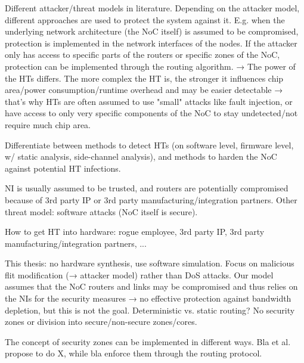 Different attacker/threat models in literature. Depending on the attacker model, different approaches are used to protect the system against it.
E.g. when the underlying network architecture (the NoC itself) is assumed to be compromised, protection is implemented in the network interfaces
of the nodes. If the attacker only has access to specific parts of the routers or specific zones of the NoC, protection can be implemented through
the routing algorithm. → The power of the HTs differs. The more complex the HT is, the stronger it influences chip area/power consumption/runtime
overhead and may be easier detectable → that's why HTs are often assumed to use "small" attacks like fault injection, or have access to only very
specific components of the NoC to stay undetected/not require much chip area.

Differentiate between methods to detect HTs (on software level, firmware level, w/ static analysis, side-channel analysis), and methods to harden
the NoC against potential HT infections.

NI is usually assumed to be trusted, and routers are potentially compromised because of 3rd party IP or 3rd party manufacturing/integration
partners. Other threat model: software attacks (NoC itself is secure).

How to get HT into hardware: rogue employee, 3rd party IP, 3rd party manufacturing/integration partners, ...

This thesis: no hardware synthesis, use software simulation. Focus on malicious flit modification (→ attacker model) rather than DoS attacks. Our
model assumes that the NoC routers and links may be compromised and thus relies on the NIs for the security measures → no effective protection
against bandwidth depletion, but this is not the goal.
Deterministic vs. static routing? No security zones or division into secure/non-secure zones/cores.

The concept of security zones can be implemented in different ways. Bla et al. propose to do X, while bla enforce them through the routing protocol.
\fi

